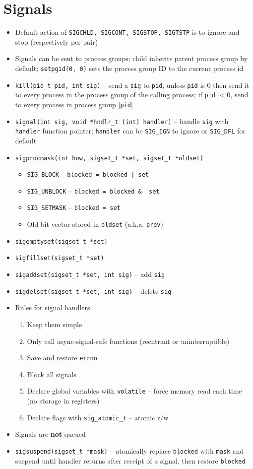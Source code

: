 \documentclass[twocolumn]{article}
\renewcommand{\tt}[1]{\texttt{#1}}
\begin{document}
\section{Signals}
\begin{itemize}[noitemsep]
    \item Default action of \tt{SIGCHLD, SIGCONT, SIGSTOP, SIGTSTP} is to ignore and stop (respectively per pair)
    \item Signals can be sent to process groups; child inherits parent process group by default; \tt{setpgid(0, 0)} sets the process group ID to the current process id
    \item \tt{kill(pid\_t pid, int sig)} -- send a \tt{sig} to \tt{pid}, unless \tt{pid} is 0 then send it to every process in the process group of the calling process; if \tt{pid} $< 0$, send to every process in process group $|$\tt{pid}$|$
    \item \tt{signal(int sig, void *hndlr\_t (int) handler)} -- handle \tt{sig} with \tt{handler} function pointer; \tt{handler} can be \tt{SIG\_IGN} to ignore or  \tt{SIG\_DFL} for default
    \item \tt{sigprocmask(int how, sigset\_t *set, sigset\_t *oldset)}
    \begin{itemize}[noitemsep]
        \item \tt{SIG\_BLOCK} -- \tt{blocked = blocked | set}
        \item \tt{SIG\_UNBLOCK} -- \tt{blocked = blocked \& ~set}
        \item \tt{SIG\_SETMASK} -- \tt{blocked = set}
        \item Old bit vector stored in \tt{oldset} (a.k.a. \tt{prev})
    \end{itemize}
    \item \tt{sigemptyset(sigset\_t *set)}
    \item \tt{sigfillset(sigset\_t *set)}
    \item \tt{sigaddset(sigset\_t *set, int sig)} -- add \tt{sig}
    \item \tt{sigdelset(sigset\_t *set, int sig)} -- delete \tt{sig}
    \item Rules for signal handlers
    \begin{enumerate}
        \item Keep them simple
        \item Only call async-signal-safe functions (reentrant or uninterruptible)
        \item Save and restore \tt{errno}
        \item Block all signals
        \item Declare global variables with \tt{volatile} -- force memory read each time (no storage in registers)
        \item Declare flags with \tt{sig\_atomic\_t} -- atomic r/w
    \end{enumerate}
    \item Signals are \textbf{not} queued
    \item \tt{sigsuspend(sigset\_t *mask)} -- atomically replace \tt{blocked} with \tt{mask} and suspend until handler returns after receipt of a signal, then restore \tt{blocked}
\end{itemize}
\end{document}
